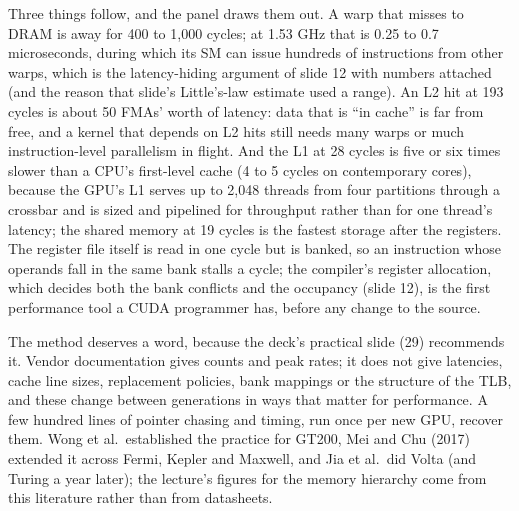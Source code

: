 \documentclass[11pt,letterpaper]{article}
\begin{document}
Three things follow, and the panel draws them out. A warp that misses to DRAM is away for 400 to 1,000 cycles; at 1.53 GHz that is 0.25 to 0.7 microseconds, during which its SM can issue hundreds of instructions from other warps, which is the latency-hiding argument of slide 12 with numbers attached (and the reason that slide's Little's-law estimate used a range). An L2 hit at 193 cycles is about 50 FMAs' worth of latency: data that is ``in cache'' is far from free, and a kernel that depends on L2 hits still needs many warps or much instruction-level parallelism in flight. And the L1 at 28 cycles is five or six times slower than a CPU's first-level cache (4 to 5 cycles on contemporary cores), because the GPU's L1 serves up to 2,048 threads from four partitions through a crossbar and is sized and pipelined for throughput rather than for one thread's latency; the shared memory at 19 cycles is the fastest storage after the registers. The register file itself is read in one cycle but is banked, so an instruction whose operands fall in the same bank stalls a cycle; the compiler's register allocation, which decides both the bank conflicts and the occupancy (slide 12), is the first performance tool a CUDA programmer has, before any change to the source.

The method deserves a word, because the deck's practical slide (29) recommends it. Vendor documentation gives counts and peak rates; it does not give latencies, cache line sizes, replacement policies, bank mappings or the structure of the TLB, and these change between generations in ways that matter for performance. A few hundred lines of pointer chasing and timing, run once per new GPU, recover them. Wong et al.\ established the practice for GT200, Mei and Chu (2017) extended it across Fermi, Kepler and Maxwell, and Jia et al.\ did Volta (and Turing a year later); the lecture's figures for the memory hierarchy come from this literature rather than from datasheets.
\end{document}
